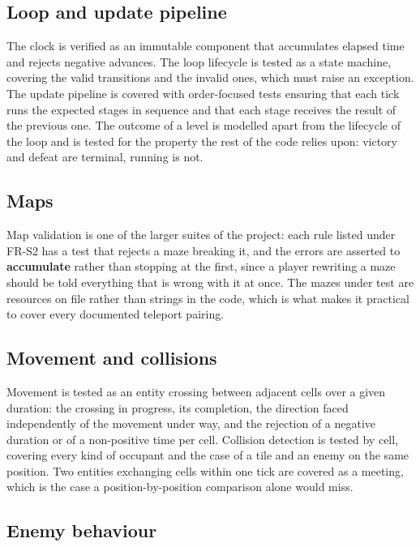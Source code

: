 \subsection{Loop and update pipeline}

The clock is verified as an immutable component that accumulates elapsed time and rejects negative advances. The loop
lifecycle is tested as a state machine, covering the valid transitions and the invalid ones, which must raise an
exception. The update pipeline is covered with order-focused tests ensuring that each tick runs the expected stages in
sequence and that each stage receives the result of the previous one. The outcome of a level is modelled apart from the
lifecycle of the loop and is tested for the property the rest of the code relies upon: victory and defeat are terminal,
running is not.

\subsection{Maps}

Map validation is one of the larger suites of the project: each rule listed under FR-S2 has a test that rejects a maze
breaking it, and the errors are asserted to \textbf{accumulate} rather than stopping at the first, since a player
rewriting a maze should be told everything that is wrong with it at once. The mazes under test are resources on file
rather than strings in the code, which is what makes it practical to cover every documented teleport pairing.

\subsection{Movement and collisions}

Movement is tested as an entity crossing between adjacent cells over a given duration: the crossing in progress, its
completion, the direction faced independently of the movement under way, and the rejection of a negative duration or of
a non-positive time per cell. Collision detection is tested by cell, covering every kind of occupant and the case of a
tile and an enemy on the same position. Two entities exchanging cells within one tick are covered as a meeting, which
is the case a position-by-position comparison alone would miss.

\subsection{Enemy behaviour}

